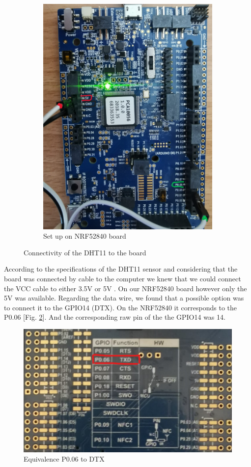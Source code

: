 \begin{figure}[!htb]
\begin{subfigure}[b]{0.45\columnwidth}
        \includegraphics[width=\columnwidth]{images/ConnectivityToBoard.jpeg}
        \caption{Set up on NRF52840 board}
    \end{subfigure}
    \caption{Connectivity of the DHT11 to the board}
    \label{fig:connectionDHT11}
\end{figure}

According to the specifications of the DHT11 sensor and considering that the board was connected by cable to the computer we
knew that we could connect the VCC cable to either 3.5V or 5V \cite{b1}. On our NRF52840 board however only the 5V was available. 
Regarding the data wire, we found that a possible option was to connect it to the GPIO14 (DTX)\cite{b2}. On the NRF52840 it corresponds to the P0.06 [Fig. \ref{fig:DTX}]. And the corresponding raw pin of the the GPIO14 was 14.

\begin{figure}[!ht]%
    \centering
    \includegraphics[scale=0.2]{images/GPIO14Arduino.jpg}%
    \caption{Equivalence P0.06 to DTX}%
    \label{fig:DTX}%
\end{figure}
